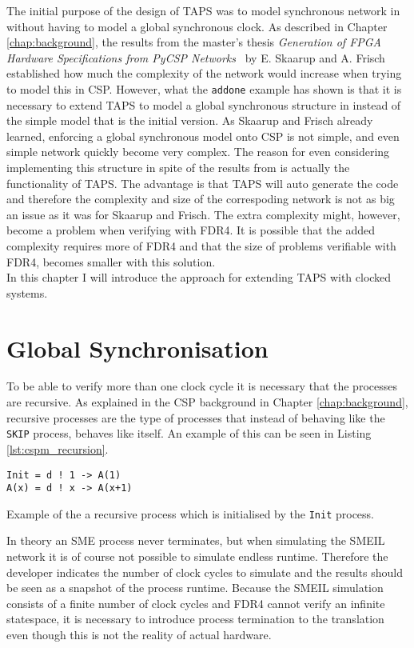 The initial purpose of the design of TAPS was to model synchronous network in \cspm{} without having to model a global synchronous clock. As described in Chapter \ref{chap:background}, the results from the master's thesis \textit{Generation of FPGA Hardware
Specifications from PyCSP Networks}~\cite{Skaarup14} by E. Skaarup and A. Frisch established how much the complexity of the network would increase when trying to model this in CSP.
However, what the \texttt{addone} example has shown is that it is necessary to extend TAPS to model a global synchronous structure in \cspm{} instead of the simple model that is the initial version. As Skaarup and Frisch already learned, enforcing a global synchronous model onto CSP is not simple, and even simple network quickly become very complex. The reason for even considering implementing this structure in spite of the results from \cite{Skaarup14} is actually the functionality of TAPS. The advantage is that TAPS will auto generate the \cspm{} code and therefore the complexity and size of the correspoding \cspm{} network is not as big an issue as it was for Skaarup and Frisch. The extra complexity might, however, become a problem when verifying with FDR4. It is possible that the added complexity requires more of FDR4 and that the size of problems verifiable with FDR4, becomes smaller with this solution. \\

In this chapter I will introduce the approach for extending TAPS with clocked systems.
\section{Global Synchronisation}
To be able to verify more than one clock cycle it is necessary that the \cspm{} processes are recursive. As explained in the CSP background in Chapter \ref{chap:background}, recursive processes are the type of processes that instead of behaving like the \texttt{SKIP} process, behaves like itself. An example of this can be seen in Listing \ref{lst:cspm_recursion}.
\begin{listing}
\begin{verbatim}
Init = d ! 1 -> A(1)
A(x) = d ! x -> A(x+1)
\end{verbatim}
\caption{Example of the a recursive \cspm{} process which is initialised by the \texttt{Init} process.}
\label{lst:cspm_recursion}
\end{listing}

In theory an SME process never terminates, but when simulating the SMEIL network it is of course not possible to simulate endless runtime. Therefore the developer indicates the number of clock cycles to simulate and the results should be seen as a snapshot of the process runtime. Because the SMEIL simulation consists of a finite number of clock cycles and FDR4 cannot verify an infinite statespace, it is necessary to introduce process termination to the translation even though this is not the reality of actual hardware. \\


